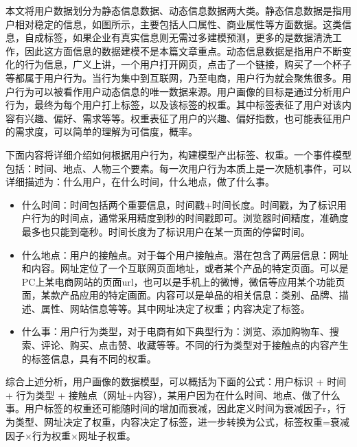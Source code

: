 		本文将用户数据划分为静态信息数据、动态信息数据两大类。静态信息数据是指用户相对稳定的信息，如图所示，主要包括人口属性、商业属性等方面数据。这类信息，自成标签，如果企业有真实信息则无需过多建模预测，更多的是数据清洗工作，因此这方面信息的数据建模不是本篇文章重点。动态信息数据是指用户不断变化的行为信息，广义上讲，一个用户打开网页，点击了一个链接，购买了一个杯子等都属于用户行为。当行为集中到互联网，乃至电商，用户行为就会聚焦很多。用户行为可以被看作用户动态信息的唯一数据来源。用户画像的目标是通过分析用户行为，最终为每个用户打上标签，以及该标签的权重。其中标签表征了用户对该内容有兴趣、偏好、需求等等。权重表征了用户的兴趣、偏好指数，也可能表征用户的需求度，可以简单的理解为可信度，概率。

		下面内容将详细介绍如何根据用户行为，构建模型产出标签、权重。一个事件模型包括：时间、地点、人物三个要素。每一次用户行为本质上是一次随机事件，可以详细描述为：什么用户，在什么时间，什么地点，做了什么事。
		\begin{itemize}
			\item 什么时间：时间包括两个重要信息，时间戳+时间长度。时间戳，为了标识用户行为的时间点，通常采用精度到秒的时间戳即可。浏览器时间精度，准确度最多也只能到毫秒。时间长度为了标识用户在某一页面的停留时间。
			\item 什么地点：用户的接触点。对于每个用户接触点。潜在包含了两层信息：网址和内容。网址定位了一个互联网页面地址，或者某个产品的特定页面。可以是PC上某电商网站的页面url，也可以是手机上的微博，微信等应用某个功能页面，某款产品应用的特定画面。内容可以是单品的相关信息：类别、品牌、描述、属性、网站信息等等。其中网址决定了权重；内容决定了标签。
			\item 什么事：用户行为类型，对于电商有如下典型行为：浏览、添加购物车、搜索、评论、购买、点击赞、收藏等等。不同的行为类型对于接触点的内容产生的标签信息，具有不同的权重。
		\end{itemize}

		综合上述分析，用户画像的数据模型，可以概括为下面的公式：用户标识 + 时间 + 行为类型 + 接触点（网址+内容），某用户因为在什么时间、地点、做了什么事。用户标签的权重还可能随时间的增加而衰减，因此定义时间为衰减因子r，行为类型、网址决定了权重，内容决定了标签，进一步转换为公式，标签权重=衰减因子×行为权重×网址子权重。

